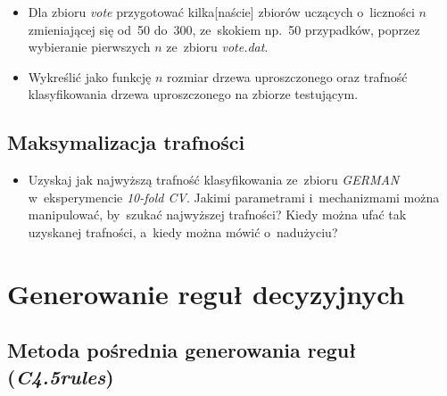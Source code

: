 \documentclass{article}
\begin{document}
\begin{itemize}
\item Dla zbioru \emph{vote} przygotować kilka[naście] zbiorów uczących o~liczności $n$ zmieniającej się od~50 do~300, ze~skokiem np.~50 przypadków, poprzez wybieranie pierwszych $n$ ze~zbioru \emph{vote.dat}.
\item Wykreślić jako funkcję $n$ rozmiar drzewa uproszczonego oraz trafność klasyfikowania drzewa uproszczonego na zbiorze testującym.

\end{itemize}

\subsection{Maksymalizacja trafności}

\begin{itemize}
\item Uzyskaj jak najwyższą trafność klasyfikowania ze~zbioru \emph{GERMAN} w~eksperymencie \emph{10-fold CV}. Jakimi parametrami i~mechanizmami można manipulować, by~szukać najwyższej trafności? Kiedy można ufać tak uzyskanej trafności, a~kiedy można mówić o~nadużyciu?
\end{itemize}


\section{Generowanie reguł decyzyjnych}

\subsection{Metoda pośrednia generowania reguł (\emph{C4.5rules})}
\end{document}
